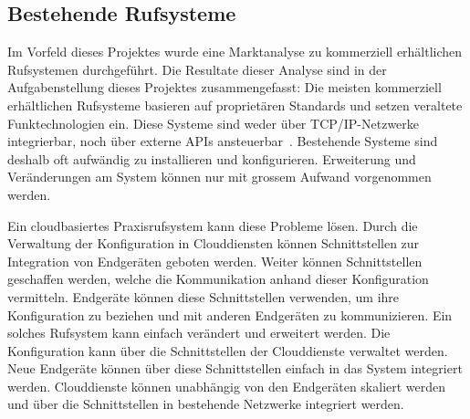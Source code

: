 \subsection{Bestehende Rufsysteme}

Im Vorfeld dieses Projektes wurde eine Marktanalyse zu kommerziell erhältlichen Rufsystemen durchgeführt.
Die Resultate dieser Analyse sind in der Aufgabenstellung dieses Projektes zusammengefasst:
Die meisten kommerziell erhältlichen Rufsysteme basieren auf proprietären Standards und setzen veraltete Funktechnologien ein.
Diese Systeme sind weder über TCP/IP-Netzwerke integrierbar, noch über externe APIs ansteuerbar~\cite{aufgabenstellung}.
Bestehende Systeme sind deshalb oft aufwändig zu installieren und konfigurieren.
Erweiterung und Veränderungen am System können nur mit grossem Aufwand vorgenommen werden.

Ein cloudbasiertes Praxisrufsystem kann diese Probleme lösen.
Durch die Verwaltung der Konfiguration in Clouddiensten können Schnittstellen zur Integration von Endgeräten geboten werden.
Weiter können Schnittstellen geschaffen werden, welche die Kommunikation anhand dieser Konfiguration vermitteln.
Endgeräte können diese Schnittstellen verwenden, um ihre Konfiguration zu beziehen und mit anderen Endgeräten zu kommunizieren.
Ein solches Rufsystem kann einfach verändert und erweitert werden.
Die Konfiguration kann über die Schnittstellen der Clouddienste verwaltet werden.
Neue Endgeräte können über diese Schnittstellen einfach in das System integriert werden.
Clouddienste können unabhängig von den Endgeräten skaliert werden und über die Schnittstellen in bestehende Netzwerke integriert werden.
